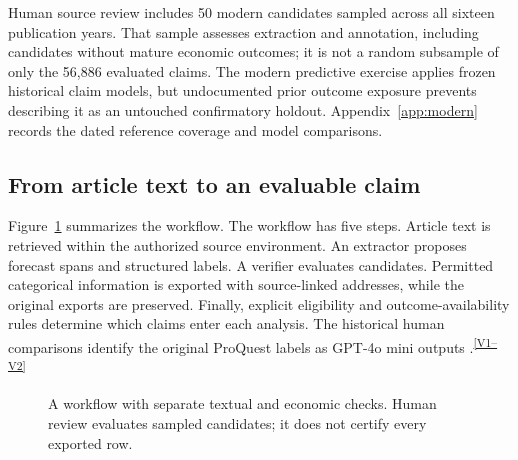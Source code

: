 \documentclass[iicol,pdflatex,sn-mathphys-num]{sn-jnl}
\newcommand{\evidence}[1]{\textsuperscript{\hyperref[app:evidence]{[#1]}}}
\begin{document}
Human source review includes 50 modern candidates sampled across all sixteen publication years. That sample assesses extraction and annotation, including candidates without mature economic outcomes; it is not a random subsample of only the 56,886 evaluated claims. The modern predictive exercise applies frozen historical claim models, but undocumented prior outcome exposure prevents describing it as an untouched confirmatory holdout. Appendix~\ref{app:modern} records the dated reference coverage and model comparisons.

\subsection{From article text to an evaluable claim}
Figure~\ref{fig:pipeline} summarizes the workflow. The workflow has five steps. Article text is retrieved within the authorized source environment. An extractor proposes forecast spans and structured labels. A verifier evaluates candidates. Permitted categorical information is exported with source-linked addresses, while the original exports are preserved. Finally, explicit eligibility and outcome-availability rules determine which claims enter each analysis. The historical human comparisons identify the original ProQuest labels as GPT-4o mini outputs \citep{openai4omini}.\evidence{V1--V2}

\begin{figure}[t]
\centering
\setlength{\fboxsep}{7pt}
\caption{A workflow with separate textual and economic checks. Human review evaluates sampled candidates; it does not certify every exported row.}
\label{fig:pipeline}
\end{figure}
\end{document}
